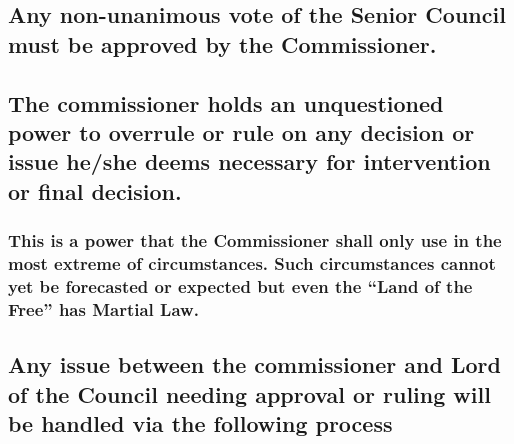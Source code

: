 \documentclass[
]{book}
\begin{document}
\hypertarget{any-non-unanimous-vote-of-the-senior-council-must-be-approved-by-the-commissioner.}{%
\subsection{Any non-unanimous vote of the Senior Council must be approved by the Commissioner.}\label{any-non-unanimous-vote-of-the-senior-council-must-be-approved-by-the-commissioner.}}

\hypertarget{the-commissioner-holds-an-unquestioned-power-to-overrule-or-rule-on-any-decision-or-issue-heshe-deems-necessary-for-intervention-or-final-decision.}{%
\subsection{The commissioner holds an unquestioned power to overrule or rule on any decision or issue he/she deems necessary for intervention or final decision.}\label{the-commissioner-holds-an-unquestioned-power-to-overrule-or-rule-on-any-decision-or-issue-heshe-deems-necessary-for-intervention-or-final-decision.}}

\hypertarget{this-is-a-power-that-the-commissioner-shall-only-use-in-the-most-extreme-of-circumstances.-such-circumstances-cannot-yet-be-forecasted-or-expected-but-even-the-land-of-the-free-has-martial-law.}{%
\subsubsection{This is a power that the Commissioner shall only use in the most extreme of circumstances. Such circumstances cannot yet be forecasted or expected but even the ``Land of the Free'' has Martial Law.}\label{this-is-a-power-that-the-commissioner-shall-only-use-in-the-most-extreme-of-circumstances.-such-circumstances-cannot-yet-be-forecasted-or-expected-but-even-the-land-of-the-free-has-martial-law.}}

\hypertarget{any-issue-between-the-commissioner-and-lord-of-the-council-needing-approval-or-ruling-will-be-handled-via-the-following-process}{%
\subsection{Any issue between the commissioner and Lord of the Council needing approval or ruling will be handled via the following process}\label{any-issue-between-the-commissioner-and-lord-of-the-council-needing-approval-or-ruling-will-be-handled-via-the-following-process}}
\end{document}
